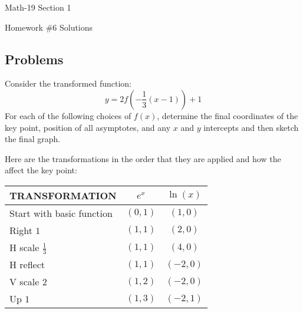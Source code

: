 \documentclass[letterpaper,12pt,fleqn]{article}
\begin{document}
\begin{center}
  \large
  Math-19 Section 1

  \Large
  Homework \#6 Solutions
\end{center}

\subsection*{Problems}

Consider the transformed function:
\[y=2f\left(-\frac{1}{3}(x-1)\right)+1\]
For each of the following choices of \(f(x)\), determine the final coordinates of the key point, position of all
asymptotes, and any \(x\) and \(y\) intercepts and then sketch the final graph.

Here are the transformations in the order that they are applied and how the affect the key point:

\begin{tabular}{l|c|c}
  TRANSFORMATION & \(e^x\) & \(\ln(x)\) \\
  \hline
  Start with basic function & \((0,1)\) & \((1,0)\) \\
  Right \(1\) & \((1,1)\) & \((2,0)\) \\
  H scale \(\frac{1}{3}\) & \((1,1)\) & \((4,0)\) \\
  H reflect & \((1,1)\) & \((-2,0)\) \\
  V scale \(2\) & \((1,2)\) & \((-2,0)\) \\
  Up \(1\) & \((1,3)\) & \((-2,1)\)
\end{tabular}
\end{document}
